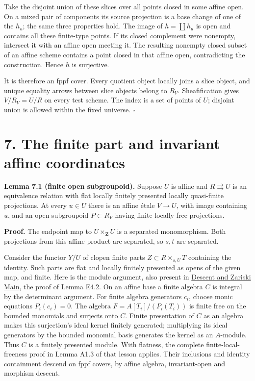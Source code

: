 \documentclass[11pt,a4paper,openany]{report}
\newcounter{none}
\begin{document}
Take the disjoint union of these slices over all points closed in some affine open. On a mixed pair of components its source projection is a base change of one of the \(h_u\); the same three properties hold. The image of \(h=\coprod h_u\) is open and contains all these finite-type points. If its closed complement were nonempty, intersect it with an affine open meeting it. The resulting nonempty closed subset of an affine scheme contains a point closed in that affine open, contradicting the construction. Hence \(h\) is surjective.

It is therefore an fppf cover. Every quotient object locally joins a slice object, and unique equality arrows between slice objects belong to \(R_V\). Sheafification gives \(V/R_V=U/R\) on every test scheme. The index is a set of points of \(U\); disjoint union is allowed within the fixed universe. \(\square\)

\section{7. The finite part and invariant affine coordinates}\label{AG-RG-S07-the-finite-part-and-invariant-affine-coordinates}

\textbf{Lemma 7.1 (finite open subgroupoid).} Suppose \(U\) is affine and \(R\rightrightarrows U\) is an equivalence relation with flat locally finitely presented locally quasi-finite projections. At every \(u\in U\) there is an affine étale \(V\to U\), with image containing \(u\), and an open subgroupoid \(P\subset R_V\) having finite locally free projections.

\textbf{Proof.} The endpoint map to \(U\times_{\mathbf Z}U\) is a separated monomorphism. Both projections from this affine product are separated, so \(s,t\) are separated.

Consider the functor \(Y/U\) of clopen finite parts \(Z\subset R\times_{s,U}T\) containing the identity. Such parts are flat and locally finitely presented as opens of the given map, and finite. Here is the module argument, also present in \href{https://github.com/KokunoYumeto/open-math-courses/blob/main/docs/courses/AG-RG/AG-RG-S04.md}{Descent and Zariski Main}, the proof of Lemma E4.2. On an affine base a finite algebra \(C\) is integral by the determinant argument. For finite algebra generators \(c_i\), choose monic equations \(P_i(c_i)=0\). The algebra \(F=A[T_i]/(P_i(T_i))\) is finite free on the bounded monomials and surjects onto \(C\). Finite presentation of \(C\) as an algebra makes this surjection's ideal kernel finitely generated; multiplying its ideal generators by the bounded monomial basis generates the kernel as an \(A\)-module. Thus \(C\) is a finitely presented module. With flatness, the complete finite-local-freeness proof in Lemma A1.3 of that lesson applies. Their inclusions and identity containment descend on fppf covers, by affine algebra, invariant-open and morphism descent.
\end{document}
